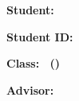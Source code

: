\begin{thesiscover}
\ThesisCoverHeading
\vspace{14mm}\ThesisCoverProgram
\vspace{14mm}\ThesisCoverTitle
\vfill
\textbf{Student: \StudentName}\par
\textbf{Student ID: \StudentId}\par
\textbf{Class: \StudentYears\ (\StudentCourse)}\par
\textbf{Advisor: \AdvisorName}\par
\ifx\AdvisorTwoName\ThesisEmpty\else\textbf{\AdvisorTwoName}\par\fi
\vfill
\ThesisCoverFooter
\end{thesiscover}
